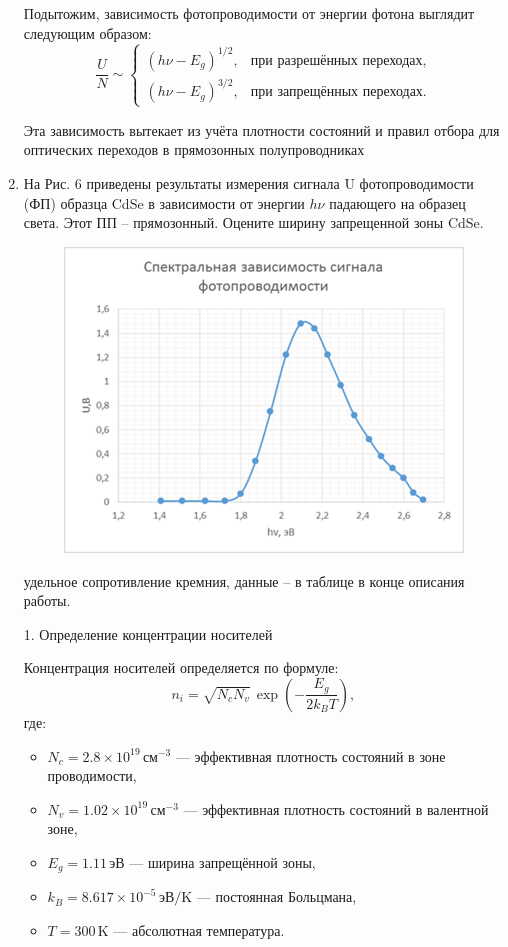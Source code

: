 \documentclass[a4paper, 12pt]{article}
\begin{document}
\begin{enumerate}
\bigskip

Подытожим, зависимость фотопроводимости от энергии фотона выглядит следующим образом:
\[
\frac{U}{N} \sim
\begin{cases}
(h\nu - E_g)^{1/2}, & \text{при разрешённых переходах}, \\
(h\nu - E_g)^{3/2}, & \text{при запрещённых переходах.}
\end{cases}
\]

Эта зависимость вытекает из учёта плотности состояний и правил отбора для оптических переходов в прямозонных полупроводниках

\item На Рис. 6 приведены результаты измерения сигнала  U фотопроводимости (ФП) образца CdSe  в зависимости от энергии $h \nu$ падающего на образец света. Этот ПП – прямозонный.
Оцените ширину запрещенной зоны CdSe.

\begin{figure}[!h]
        \centering
        \includegraphics[scale=0.7]{img/12.png}
        \caption{}
\end{figure}

 удельное сопротивление кремния, данные – в таблице в конце описания работы.

1. Определение концентрации носителей

Концентрация носителей определяется по формуле:
\[
n_i = \sqrt{N_c N_v}\, \exp\left(-\frac{E_g}{2 k_B T}\right),
\]
где:
\begin{itemize}
    \item \( N_c = 2.8\times10^{19}\,\text{см}^{-3} \) --- эффективная плотность состояний в зоне проводимости,
    \item \( N_v = 1.02\times10^{19}\,\text{см}^{-3} \) --- эффективная плотность состояний в валентной зоне,
    \item \( E_g = 1.11\,\text{эВ} \) --- ширина запрещённой зоны,
    \item \( k_B = 8.617\times10^{-5}\,\text{эВ/K} \) --- постоянная Больцмана,
    \item \( T = 300\,\text{K} \) --- абсолютная температура.
\end{itemize}


\end{enumerate}
\end{document}

